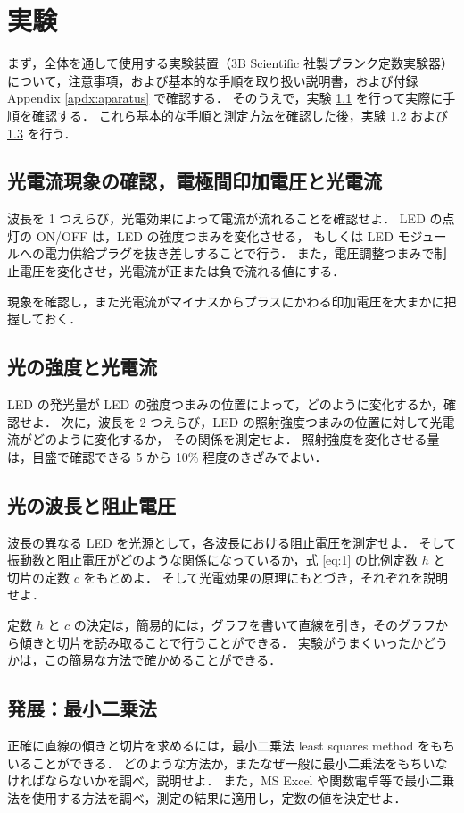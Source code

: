 \documentclass[11pt,sort]{jarticle}
\begin{document}
\section{実験}

まず，全体を通して使用する実験装置（3B Scientific 社製プランク定数実験器）について，注意事項，および基本的な手順を取り扱い説明書，および付録 Appendix \ref{apdx:aparatus} で確認する．
そのうえで，実験 \ref{a} を行って実際に手順を確認する．
これら基本的な手順と測定方法を確認した後，実験 \ref{b} および \ref{c} を行う．


\subsection{光電流現象の確認，電極間印加電圧と光電流}\label{a}

波長を 1 つえらび，光電効果によって電流が流れることを確認せよ．
LED の点灯の ON/OFF は，LED の強度つまみを変化させる，
もしくは LED モジュールへの電力供給プラグを抜き差しすることで行う．
また，電圧調整つまみで制止電圧を変化させ，光電流が正または負で流れる値にする．

現象を確認し，また光電流がマイナスからプラスにかわる印加電圧を大まかに把握しておく．

\subsection{光の強度と光電流}\label{b}

LED の発光量が LED の強度つまみの位置によって，どのように変化するか，確認せよ．
次に，波長を 2 つえらび，LED の照射強度つまみの位置に対して光電流がどのように変化するか，
その関係を測定せよ．
照射強度を変化させる量は，目盛で確認できる 5 から 10\% 程度のきざみでよい．

\subsection{光の波長と阻止電圧}\label{c}

波長の異なる LED を光源として，各波長における阻止電圧を測定せよ．
そして振動数と阻止電圧がどのような関係になっているか，式 \ref{eq:1} の比例定数 $h$ と切片の定数 $c$ をもとめよ．
そして光電効果の原理にもとづき，それぞれを説明せよ．

定数 $h$ と $c$ の決定は，簡易的には，グラフを書いて直線を引き，そのグラフから傾きと切片を読み取ることで行うことができる．
実験がうまくいったかどうかは，この簡易な方法で確かめることができる．

\subsection{発展：最小二乗法}
正確に直線の傾きと切片を求めるには，最小二乗法 least squares method をもちいることができる．
どのような方法か，またなぜ一般に最小二乗法をもちいなければならないかを調べ，説明せよ．
また，MS Excel や関数電卓等で最小二乗法を使用する方法を調べ，測定の結果に適用し，定数の値を決定せよ．
\end{document}
